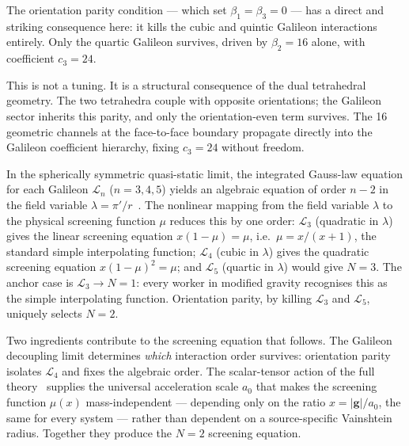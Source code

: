 \documentclass[a4paper,11pt]{article}
\begin{document}
The orientation parity condition --- which set
$\beta_1 = \beta_3 = 0$ --- has a direct and striking
consequence here: it kills the cubic and quintic Galileon
interactions entirely. Only the quartic Galileon survives,
driven by $\beta_2 = 16$ alone, with coefficient
$c_3 = 24$.

This is not a tuning. It is a structural consequence of
the dual tetrahedral geometry. The two tetrahedra couple
with opposite orientations; the Galileon sector inherits
this parity, and only the orientation-even term survives.
The 16 geometric channels at the face-to-face boundary
propagate directly into the Galileon coefficient hierarchy,
fixing $c_3 = 24$ without freedom.

In the spherically symmetric quasi-static limit, the
integrated Gauss-law equation for each Galileon
$\mathcal{L}_n$ ($n = 3, 4, 5$) yields an algebraic
equation of order $n - 2$ in the field variable
$\lambda = \pi'/r$~\cite{Vainshtein1972}. The nonlinear
mapping from the field variable $\lambda$ to the physical
screening function $\mu$ reduces this by one order:
$\mathcal{L}_3$ (quadratic in $\lambda$) gives the linear
screening equation $x(1 - \mu) = \mu$, i.e.\
$\mu = x/(x+1)$, the standard simple interpolating
function; $\mathcal{L}_4$ (cubic in $\lambda$) gives the
quadratic screening equation $x(1 - \mu)^2 = \mu$; and
$\mathcal{L}_5$ (quartic in $\lambda$) would give
$N = 3$. The anchor case is $\mathcal{L}_3 \to N = 1$:
every worker in modified gravity recognises this as the
simple interpolating function. Orientation parity, by
killing $\mathcal{L}_3$ and $\mathcal{L}_5$, uniquely
selects $N = 2$.

Two ingredients contribute to the screening equation that
follows. The Galileon decoupling limit determines \emph{which}
interaction order survives: orientation parity isolates
$\mathcal{L}_4$ and fixes the algebraic order. The
scalar-tensor action of the full
theory~\cite{Nelson2026_MNRAS} supplies the universal
acceleration scale $a_0$ that makes the screening function
$\mu(x)$ mass-independent --- depending only on the ratio
$x = |\mathbf{g}|/a_0$, the same for every system --- rather
than dependent on a source-specific Vainshtein radius.
Together they produce the $N = 2$ screening equation.
\end{document}
